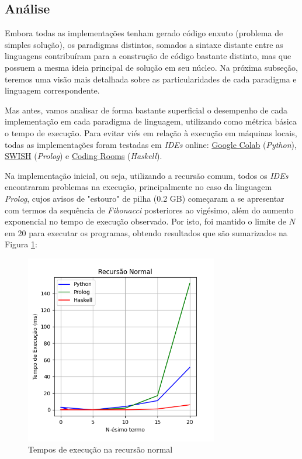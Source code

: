 \documentclass[a4paper, 12pt]{article}
\begin{document}
\subsection{Análise}

Embora todas as implementações tenham gerado código enxuto (problema de simples solução), os paradigmas distintos, somados a sintaxe distante entre as linguagens contribuíram para a construção de código bastante distinto, mas que possuem a mesma ideia principal de solução em seu núcleo. Na próxima subseção, teremos uma visão mais detalhada sobre as particularidades de cada paradigma e linguagem correspondente. 

Mas antes, vamos analisar de forma bastante superficial o desempenho de cada implementação em cada paradigma de linguagem, utilizando como métrica básica o tempo de execução. Para evitar viés em relação à execução em máquinas locais, todas as implementações foram testadas em \emph{IDEs} online: \hyperlink{https://colab.research.google.com/}{Google Colab} (\emph{Python}), \hyperlink{https://swish.swi-prolog.org/}{SWISH} (\emph{Prolog}) e \hyperlink{https://www.codingrooms.com/}{Coding Rooms} (\emph{Haskell}).

Na implementação inicial, ou seja, utilizando a recursão comum, todos os \emph{IDEs} encontraram problemas na execução, principalmente no caso da linguagem \emph{Prolog}, cujos avisos de "estouro" de pilha (0.2 GB) começaram a se apresentar com termos da sequência de \emph{Fibonacci} posteriores ao vigésimo, além do aumento exponencial no tempo de execução observado. Por isto, foi mantido o limite de \(N\) em 20 para executar os programas, obtendo resultados que são sumarizados na Figura \ref{fig:exampleFig4}:

\begin{figure}[H]
    \centering
    \includegraphics[width=0.75\textwidth]{Images/normal.png}
    \caption{Tempos de execução na recursão normal}
    \label{fig:exampleFig4}
\end{figure}
\end{document}
